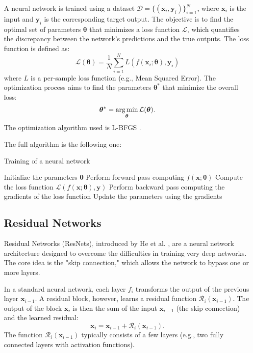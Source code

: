 A neural network is trained using a dataset \( \mathcal{D} = \{(\bm{x}_i, \bm{y}_i)\}_{i=1}^N \), where \( \bm{x}_i \) is the input and \( \bm{y}_i \) is the corresponding target output. The objective is to find the optimal set of parameters \( \bm{\theta} \) that minimizes a loss function \( \mathcal{L} \), which quantifies the discrepancy between the network's predictions and the true outputs. The loss function is defined as:
\begin{equation}
    \mathcal{L}(\bm{\theta}) = \frac{1}{N} \sum_{i=1}^N L(f(\bm{x}_i; \bm{\theta}), \bm{y}_i)
\end{equation}
where \( L \) is a per-sample loss function (e.g., Mean Squared Error). The optimization process aims to find the parameters \( \bm{\theta}^* \) that minimize the overall loss:
\begin{equation}
    \bm{\theta}^* = \operatorname*{arg\,min}_{\bm{\theta}} \mathcal{L}(\bm{\theta}).
\end{equation}
The optimization algorithm used is L-BFGS \cite{Liu_1989}.

The full algorithm is the following one:
\begin{algorithm} 
    \caption{Training of a neural network}
    \begin{algorithmic}
        \State Initialize the parameters \( \bm{\theta} \)
                \State Perform forward pass computing \( f(\bm{x}; \bm{\theta}) \)
                \State Compute the loss function \( \mathcal{L}(f(\bm{x}; \bm{\theta}), \bm{y}) \)
                \State Perform backward pass computing the gradients of the loss function
                \State Update the parameters using the gradients
            \EndFor
        \EndWhile
    \end{algorithmic}
\end{algorithm}

\subsection{Residual Networks}

Residual Networks (ResNets), introduced by He et al. \cite{He_Zhang_Ren_Sun_2015}, are a neural network architecture designed to overcome the difficulties in training very deep networks. The core idea is the "skip connection," which allows the network to bypass one or more layers.

In a standard neural network, each layer \(f_i\) transforms the output of the previous layer \( \bm{x}_{i-1} \). A residual block, however, learns a residual function \( \mathcal{R}_i(\bm{x}_{i-1}) \). The output of the block \( \bm{x}_i \) is then the sum of the input \( \bm{x}_{i-1} \) (the skip connection) and the learned residual:
\begin{equation}
    \bm{x}_i = \bm{x}_{i-1} + \mathcal{R}_i(\bm{x}_{i-1}).
\end{equation}
The function \( \mathcal{R}_i(\bm{x}_{i-1}) \) typically consists of a few layers (e.g., two fully connected layers with activation functions).

